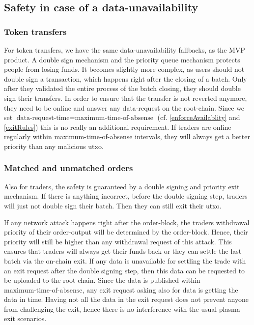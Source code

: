 \documentclass[11pt,parskip=full]{scrartcl}%
\begin{document}
\subsection{Safety in case of a data-unavailability}

\subsubsection{Token transfers}
For token transfers, we have the same data-unavailability fallbacks, as the MVP product. 
A double sign mechanism and the priority queue mechanism protects people from losing funds. 
It becomes slightly more complex, as users should not double sign a transaction, which happens right after the closing of a batch.
Only after they validated the entire process of the batch closing, they should double sign their transfers.
In order to ensure that the transfer is not reverted anymore, they need to be online and answer any data-request on the root-chain. Since we set $\text{data-request-time} = \text{maximum-time-of-absense}$ (cf. \ref{enforceAvailablity} and \ref{exitRules}) this is no really an additional requirement.\newline
If traders are online regularly within maximum-time-of-absense intervals, they will always get a better priority than any malicious utxo.

\subsubsection{Matched and unmatched orders}
Also for traders, the safety is guaranteed by a  double signing and priority exit mechanism. 
If there is anything incorrect, before the double signing step, traders will just not double sign their batch. 
Then they can still exit their utxo. \newline

If any network attack happens right after the order-block, the traders withdrawal priority of their order-output will be determined by the order-block.
Hence, their priority will still be higher than any withdrawal request of this attack.
This ensures that traders will always get their funds back or they can settle the last batch via the on-chain exit. 
If any data is unavailable for settling the trade with an exit request after the double signing step, then this data can be requested to be uploaded to the root-chain. 
Since the data is published within $\text{maximum-time-of-absense}$, any exit request asking also for data is getting the data in time. 
Having not all the data in the exit request does not prevent anyone from challenging the exit, hence there is no interference with the usual plasma exit scenarios.
\end{document}
